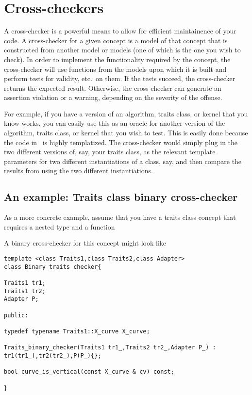 \section{Cross-checkers}
\label{sec:debugging_cross_checker}

A cross-checker is a powerful means to allow for efficient
maintainence of your code.  A cross-checker for a given concept is a
model of that concept  that is
constructed from another model or models (one of which is the one you
wish to check).  In order to implement the functionality required by
the concept, the cross-checker will use functions from the models upon
which it is built and perform tests for validity, etc.\ on them.  If
the tests succeed, the cross-checker returns the expected result.
Otherwise, the cross-checker can generate an assertion violation or a
warning, depending on the severity of the offense.

For example, if you have a version of an algorithm, traits class, or
kernel that you know works, you can easily use this as an oracle for
another version of the algorithm, traits class, or kernel that you
wish to test.  This is easily done because the code in \cgal\ is
highly templatized.  The cross-checker would simply plug in the two
different versions of, say, your traits class, as the relevant
template parameters for two different instantiations of a class, say,
and then compare the results from using the two different
instantiations.

\subsection*{An example: Traits class binary cross-checker}

As a more concrete example, assume that you have a traits class concept 
that requires a nested type  and a function


A binary cross-checker for this concept might look like 
\begin{verbatim}
template <class Traits1,class Traits2,class Adapter>
class Binary_traits_checker{

Traits1 tr1;
Traits1 tr2;
Adapter P;

public:

typedef typename Traits1::X_curve X_curve;

Traits_binary_checker(Traits1 tr1_,Traits2 tr2_,Adapter P_) :
tr1(tr1_),tr2(tr2_),P(P_){};

bool curve_is_vertical(const X_curve & cv) const;

}
\end{verbatim}

